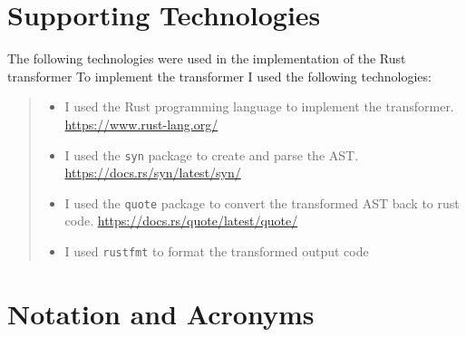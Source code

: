 \documentclass[ oneside,%
                    author={James Elgar},
                    degree={MEng},
                     title={Bidirectional transformer between functional and \\ object-oriented programming in Rust},
                  subtitle={}]{dissertation}
\begin{document}
\chapter*{Supporting Technologies}

\noindent
The following technologies were used in the implementation of the Rust transformer To implement the transformer I used the following technologies:

\begin{quote}
\noindent
\begin{itemize}
\item I used the Rust programming language to implement the transformer. \url{https://www.rust-lang.org/}
\item I used the \verb|syn| package to create and parse the AST. \url{https://docs.rs/syn/latest/syn/}
\item I used the \verb|quote| package to convert the transformed AST back to rust code. \url{https://docs.rs/quote/latest/quote/}
\item I used \verb|rustfmt| to format the transformed output code
\end{itemize}
\end{quote}


\chapter*{Notation and Acronyms}


\noindent

\end{document}
